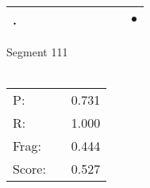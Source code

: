 \documentclass[landscape]{article}
\newcommand{\ssp}{\hspace{2pt}}
\newcommand{\mex}{\cellcolor{g}$\bullet$}
\begin{document}
\begin{tabular}{|l|p{10pt}|p{10pt}|p{10pt}|p{10pt}|p{10pt}|p{10pt}|p{10pt}|p{10pt}|p{10pt}|}
\hline
\ssp \cellcolor{ref8}. \ssp&\hspace{2pt}&\hspace{2pt}&\hspace{2pt}&\hspace{2pt}&\hspace{2pt}&\hspace{2pt}&\hspace{2pt}&\hspace{2pt}&\hspace{2pt}\mex\\
\hline
\end{tabular}

\vspace{6pt}
\noindent Segment 111\\\\
\noindent\begin{tabular}{lm{12pt}r}
\hline
P:&&0.731\\
R:&&1.000\\
Frag:&&0.444\\
Score:&&0.527\\
\end{tabular}

\newpage
\end{document}
